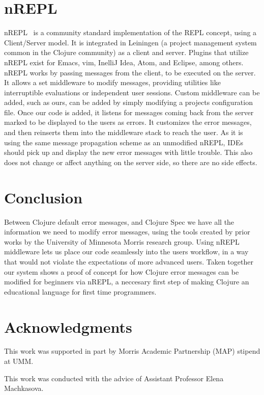 \documentclass[12pt]{article}
\begin{document}
\section{nREPL}
nREPL~\cite{nrepl} is a community standard implementation of the REPL concept,
 using a
\newline
Client/Server model. It is integrated in Leiningen
 (a project management system common in the Clojure community) as a client and server.
 Plugins that utilize nREPL exist for Emacs, vim, InelliJ Idea, Atom, and Eclipse,
among others.
nREPL works by passing messages from the client, to be executed on the server.
It allows a set middleware to modify messages, providing utilities
like interruptible evaluations or independent user sessions.
Custom middleware can be added, such as ours, can be added by simply
modifying a projects configuration file. Once our code is added,
it listens for messages coming back from the server
marked to be displayed to the users as errors.
It customizes the error messages, and then reinserts them into the middleware stack
to reach the user. As it is using the same message propagation scheme as an unmodified nREPL,
IDEs should pick up and display the new error messages with little trouble.
This also does not change or affect anything on the server side, so there are no side effects.

\section{Conclusion}
Between Clojure default error messages, and Clojure Spec
we have all the information we need to modify error messages, using the
tools created by prior works by the University of Minnesota Morris research group. \cite{mics2017}
Using nREPL middleware lets us place our code seamlessly into the users
workflow, in a way that would not violate the expectations of more advanced users.
 Taken together our system shows a proof of concept for how Clojure
error messages can be modified for beginners via nREPL, a neccesary first step of making
Clojure an educational language for first time programmers.


\section{Acknowledgments}
This work was supported in part by Morris Academic Partnership (MAP) stipend at UMM.

This work was conducted with the advice of Assistant Professor Elena Machkasova.



\end{document}

